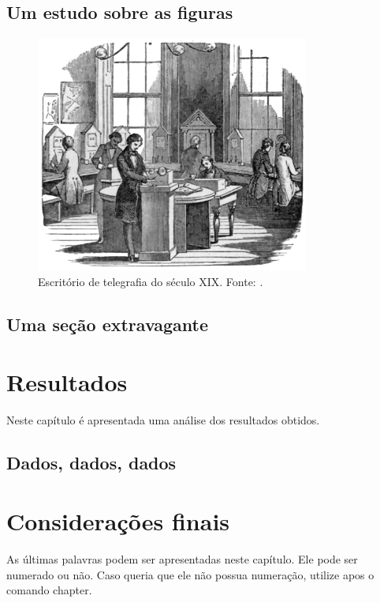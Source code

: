 \documentclass[
	12pt,				%
	openright,			%
	oneside,			%
	a4paper,			%
	english,			%
	brazil				%
	]{abntex2}
\begin{document}
\section*{Um estudo sobre as figuras} %

\begin{figure}
\centering
\includegraphics[width=0.8\textwidth]{fig09.pdf}
\caption[Escritório de telégrafos]{Escritório de telegrafia do século XIX. Fonte: \textcite{thomson_1869}.}
\end{figure}


\section{Uma seção extravagante}
\lipsum[21]


\chapter{Resultados} \label{cap:resultados}

Neste capítulo é apresentada uma análise dos resultados obtidos.

\section{Dados, dados, dados}
\lipsum[21]

\chapter{Considerações finais}
As últimas palavras podem ser apresentadas neste capítulo. Ele pode ser numerado ou não. Caso queria que ele não possua numeração, utilize \* apos o comando chapter.
\end{document}
